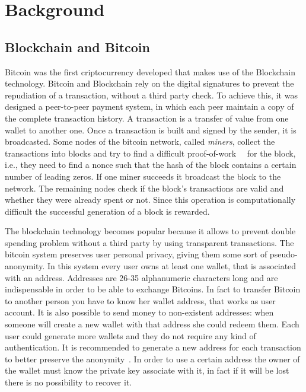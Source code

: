 \section{Background}
\subsection{Blockchain and Bitcoin}
Bitcoin was the first criptocurrency developed that makes use of the
Blockchain technology. Bitcoin and Blockchain rely on the digital
signatures to prevent the repudiation of a transaction, without a third
party check.
To achieve this, it was designed a peer-to-peer payment system,
in which each peer maintain a copy of the complete transaction history.
A transaction is a transfer of value from one wallet to another one.
Once a transaction is built and signed by the sender, it is broadcasted.
Some nodes of the bitcoin network, called \textit{miners}, collect the
transactions into blocks and try to find a difficult
proof-of-work~\cite{pricing}~\cite{hashcash} for the
block, i.e., they need to find a nonce such that the hash of the block
contains a certain number of leading zeros.
If one miner succeeds it broadcast the block to the network.
The remaining nodes check if the block's transactions are valid and
whether they were already spent or not.
Since this operation is computationally difficult the successful
generation of a block is rewarded.

The blockchain technology becomes popular because it allows
to prevent double spending problem without a third party by using
transparent transactions.
The bitcoin system preserves user personal privacy, giving them some
sort of pseudo-anonymity.
In this system every user owns at least one wallet, that is associated
with an address. Addresses are 26-35 alphanumeric characters long and
are indispensable in order to be able to exchange Bitcoins.
In fact to transfer Bitcoin to another person you have to know her
wallet address, that works as user account.
It is also possible to send money to non-existent addresses: when
someone will create a new wallet with that address she could redeem
them.
Each user could generate more wallets and they do not require any kind
of authentication.
It is recommended to generate a new address for each transaction
to better preserve the anonymity~\cite{satoshi}.
In order to use a certain address the owner of the wallet must know
the private key associate with it, in fact if it
will be lost there is no possibility to recover it.


